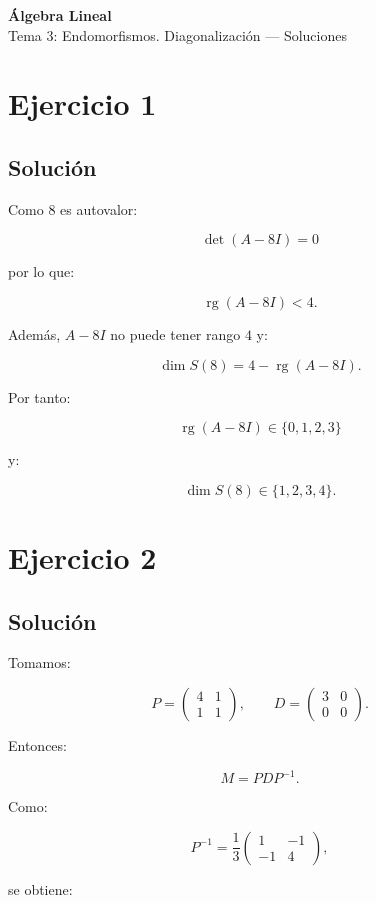 \documentclass[11pt,a4paper]{article}
\newcommand{\rg}{\operatorname{rg}}
\begin{document}
\begin{center}
{\LARGE\bfseries Álgebra Lineal}\\[0.4em]
{\Large Tema 3: Endomorfismos. Diagonalización --- Soluciones}
\end{center}

\section{Ejercicio 1}
\subsection{Solución}

Como $8$ es autovalor:

\[
\det(A-8I)=0
\]

por lo que:

\[
\rg(A-8I)<4.
\]

Además, $A-8I$ no puede tener rango $4$ y:

\[
\dim S(8)=4-\rg(A-8I).
\]

Por tanto:

\[
\boxed{
\rg(A-8I)\in\{0,1,2,3\}
}
\]

y:

\[
\boxed{
\dim S(8)\in\{1,2,3,4\}.
}
\]

\section{Ejercicio 2}
\subsection{Solución}

Tomamos:

\[
P=
\begin{pmatrix}
4&1\\
1&1
\end{pmatrix},
\qquad
D=
\begin{pmatrix}
3&0\\
0&0
\end{pmatrix}.
\]

Entonces:

\[
M=PDP^{-1}.
\]

Como:

\[
P^{-1}
=
\frac13
\begin{pmatrix}
1&-1\\
-1&4
\end{pmatrix},
\]

se obtiene:
\end{document}
